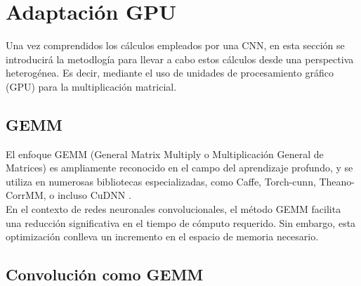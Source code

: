 \chapter{Adaptación GPU}

Una vez comprendidos los cálculos empleados por una CNN, en esta sección se introducirá la metodlogía para llevar a cabo estos cálculos desde una perspectiva heterogénea. Es decir, mediante el uso de unidades de procesamiento gráfico (GPU) para la multiplicación matricial.

\section{GEMM}

El enfoque GEMM \cite{GEMM_definition} (General Matrix Multiply o Multiplicación General de Matrices) es ampliamente reconocido en el campo del aprendizaje profundo, y se utiliza en numerosas bibliotecas especializadas, como Caffe, Torch-cunn, Theano-CorrMM, o incluso CuDNN \cite{conv_GEMM_FFT_comparacion}. \\
En el contexto de redes neuronales convolucionales, el método GEMM facilita una reducción significativa en el tiempo de cómputo requerido. Sin embargo, esta optimización conlleva un incremento en el espacio de memoria necesario. 

\section{Convolución como GEMM \label{Intro_GEMMM}}

